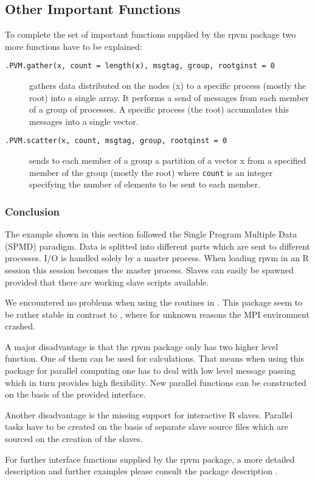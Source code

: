 \subsection{Other Important Functions}

To complete the set of important functions supplied by the rpvm
package two more functions have to be explained:

\begin{description}
\item[\texttt{.PVM.gather(x, count = length(x), msgtag, group,
    rootginst = 0}] gathers data distributed on the nodes (x) to a
  specific process (mostly the root) into a single array. It performs
  a send of messages from each member of a group of processes. A
  specific process (the root) accumulates this messages into a single
  vector. 
\item[\texttt{.PVM.scatter(x, count, msgtag, group, rootqinst = 0}]
  sends to each member of a group a partition of  a vector x from a
  specified member of the group (mostly the root) where \texttt{count}
  is an integer specifying the number of elements to be sent to each
  member. 
\end{description}

\subsubsection{Conclusion}

The  example shown in this section followed the
Single Program Multiple Data (SPMD) paradigm. Data is splitted into
different parts which are sent to different processes. I/O is handled
solely by a master
process. When loading rpvm in an R session this session becomes the
master process. Slaves can easily be spawned provided that there are
working slave scripts available.

We encountered no problems when using the routines in . This
package seem to be rather stable in contrast to , where for
unknown reasons the MPI environment crashed.

A major disadvantage is that the rpvm
package only has two higher level function. One of them can be used
for calculations. That means when using this package for parallel
computing one has 
to deal with low level message passing which in turn provides high
flexibility. New parallel functions can be constructed on the basis of
the provided interface. 

Another disadvantage is the missing support for interactive R
slaves. Parallel tasks have to be created on the basis of separate
slave source files which are sourced on the creation of the slaves.

For further interface functions supplied by the rpvm package, a more
detailed 
description and further examples please consult the package description
\cite{nali07rpvm}.

